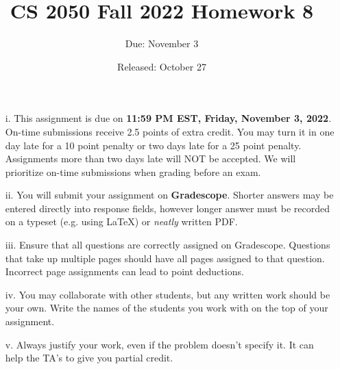 \documentclass{article}
\title{CS 2050 Fall 2022 Homework 8}
\author{Due: November 3}
\date{Released: October 27}
\begin{document}
\maketitle

\begin{enumerate}
    \item[i.] This assignment is due on \textbf{11:59 PM EST, Friday, November 3, 2022}.  On-time submissions receive 2.5 points of extra credit. You may turn it in one day late for a 10 point penalty or two days late for a 25 point penalty. Assignments more than two days late will NOT be accepted.  We will prioritize on-time submissions when grading before an exam.
    \item[ii.] You will submit your assignment on \textbf{Gradescope}. Shorter answers may be entered directly into response fields, however longer answer must be recorded on a typeset (e.g. using \LaTeX) or \emph{neatly} written PDF.
    \item[iii.] Ensure that all questions are correctly assigned on Gradescope. Questions that take up multiple pages should have all pages assigned to that question. Incorrect page assignments can lead to point deductions.
    \item[iv.] You may collaborate with other students, but any written work should be your own. Write the names of the students you work with on the top of your assignment.
    \item[v.] Always justify your work, even if the problem doesn't specify it. It can help the TA's to give you partial credit.
\end{enumerate}
\end{document}
